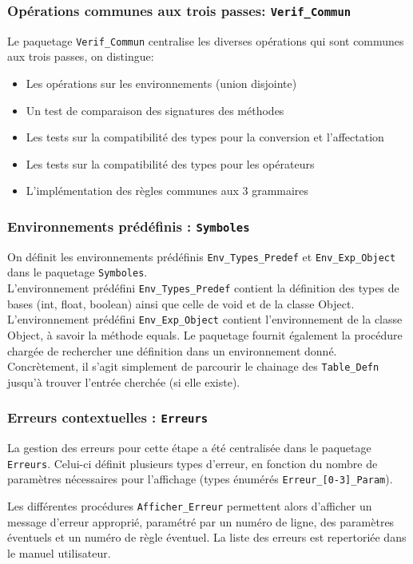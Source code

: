 \subsubsection{Opérations communes aux trois passes: \texttt{Verif\_Commun}}
 Le paquetage \verb!Verif_Commun! centralise les diverses opérations qui sont communes aux trois passes, on distingue:
\begin{itemize}
\item Les opérations sur les environnements (union disjointe)
\item Un test de comparaison des signatures des méthodes
\item Les tests sur la compatibilité des types pour la conversion et l'affectation
\item Les tests sur la compatibilité des types pour les opérateurs
\item L'implémentation des règles communes aux 3 grammaires
\end{itemize}

\subsubsection{Environnements prédéfinis : \texttt{Symboles}}

On définit les environnements prédéfinis \verb!Env_Types_Predef! et \verb!Env_Exp_Object! dans le paquetage \verb!Symboles!. \\
L'environnement prédéfini \verb!Env_Types_Predef! contient la définition des types de bases (int, float, boolean) ainsi que celle de void et de la classe Object.
L'environnement prédéfini \verb!Env_Exp_Object! contient l'environnement de la classe Object, à savoir la méthode equals.
Le paquetage fournit également la procédure chargée de rechercher une définition dans un environnement donné. Concrètement, il s'agit simplement de parcourir le chainage des \verb!Table_Defn! jusqu'à trouver l'entrée cherchée (si elle existe).

\subsubsection{Erreurs contextuelles : \texttt{Erreurs}}

La gestion des erreurs pour cette étape a été centralisée dans le paquetage \verb!Erreurs!. Celui-ci définit plusieurs types d'erreur, en fonction du nombre de paramètres nécessaires pour l'affichage (types énumérés \verb!Erreur_[0-3]_Param!).

Les différentes procédures \verb!Afficher_Erreur! permettent alors d'afficher un message d'erreur approprié, paramétré par un numéro de ligne, des paramètres éventuels et un numéro de règle éventuel. 
La liste des erreurs est repertoriée dans le manuel utilisateur.




